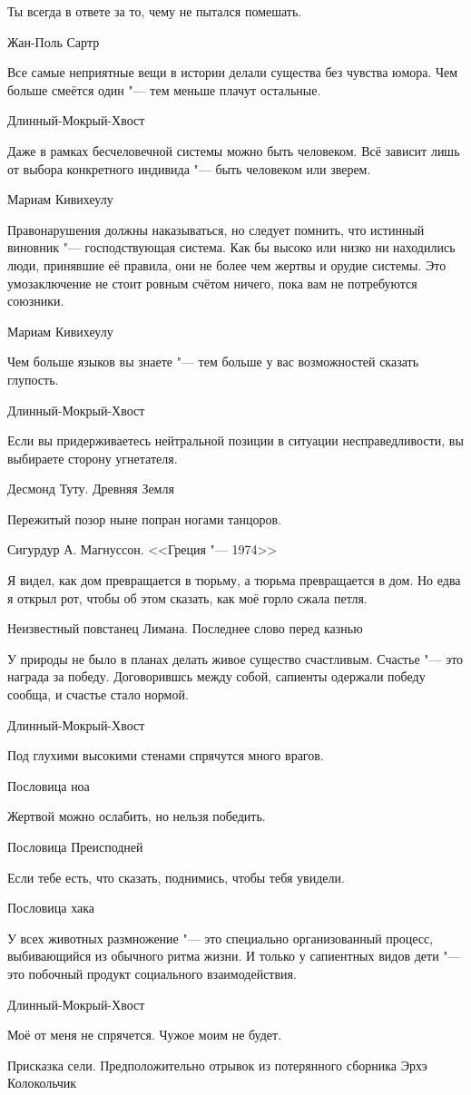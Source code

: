 \epigraph
{Ты всегда в ответе за то, чему не пытался помешать.}
{Жан-Поль Сартр}

\epigraph
{Все самые неприятные вещи в истории делали существа без чувства юмора.
Чем больше смеётся один "--- тем меньше плачут остальные.}
{Длинный-Мокрый-Хвост}

\epigraph
{Даже в рамках бесчеловечной системы можно быть человеком.
Всё зависит лишь от выбора конкретного индивида "--- быть человеком или зверем.}
{Мариам Кивихеулу}

\epigraph
{Правонарушения должны наказываться, но следует помнить, что истинный виновник "--- господствующая система.
Как бы высоко или низко ни находились люди, принявшие её правила, они не более чем жертвы и орудие системы.
Это умозаключение не стоит ровным счётом ничего, пока вам не потребуются союзники.}
{Мариам Кивихеулу}

\epigraph
{Чем больше языков вы знаете "--- тем больше у вас возможностей сказать глупость.}
{Длинный-Мокрый-Хвост}

\epigraph
{Если вы придерживаетесь нейтральной позиции в ситуации несправедливости, вы выбираете сторону угнетателя.}
{Десмонд Туту. Древняя Земля}

\epigraph
{Пережитый позор ныне попран ногами танцоров.}
{Сигурдур А. Магнуссон. <<Греция "--- 1974>>}

\epigraph
{Я видел, как дом превращается в тюрьму, а тюрьма превращается в дом.
Но едва я открыл рот, чтобы об этом сказать, как моё горло сжала петля.}
{Неизвестный повстанец Лимана.
Последнее слово перед казнью}

\epigraph{У природы не было в планах делать живое существо счастливым.
Счастье "--- это награда за победу.
Договорившсь между собой, сапиенты одержали победу сообща, и счастье стало нормой.}
{Длинный-Мокрый-Хвост}

\epigraph{Под глухими высокими стенами спрячутся много врагов.}
{Пословица ноа}

\epigraph
{Жертвой можно ослабить, но нельзя победить.}
{Пословица Преисподней}

\epigraph
{Если тебе есть, что сказать, поднимись, чтобы тебя увидели.}
{Пословица хака}

\epigraph
{У всех животных размножение "--- это специально организованный процесс, выбивающийся из обычного ритма жизни.
И только у сапиентных видов дети "--- это побочный продукт социального взаимодействия.}
{Длинный-Мокрый-Хвост}

\epigraph
{Моё от меня не спрячется.
Чужое моим не будет.}
{Присказка сели.
Предположительно отрывок из потерянного сборника Эрхэ Колокольчик}

